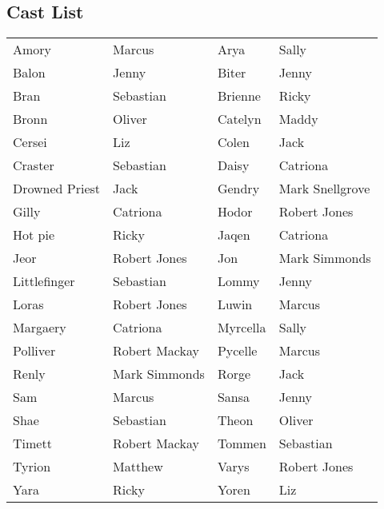 \subsection*{Cast List}
\begin{tabular}{ll|ll}\\
Amory & Marcus &  Arya & Sally\\
Balon & Jenny &  Biter & Jenny\\
Bran & Sebastian &  Brienne & Ricky\\
Bronn & Oliver &  Catelyn & Maddy\\
Cersei & Liz &  Colen & Jack\\
Craster & Sebastian &  Daisy & Catriona\\
Drowned Priest & Jack &  Gendry & Mark Snellgrove\\
Gilly & Catriona &  Hodor & Robert Jones\\
Hot pie & Ricky &  Jaqen & Catriona\\
Jeor & Robert Jones &  Jon & Mark Simmonds\\
Littlefinger & Sebastian &  Lommy & Jenny\\
Loras & Robert Jones &  Luwin & Marcus\\
Margaery & Catriona &  Myrcella & Sally\\
Polliver & Robert Mackay &  Pycelle & Marcus\\
Renly & Mark Simmonds &  Rorge & Jack\\
Sam & Marcus &  Sansa & Jenny\\
Shae & Sebastian &  Theon & Oliver\\
Timett & Robert Mackay &  Tommen & Sebastian\\
Tyrion & Matthew &  Varys & Robert Jones\\
Yara & Ricky &  Yoren & Liz\\
\end{tabular}
